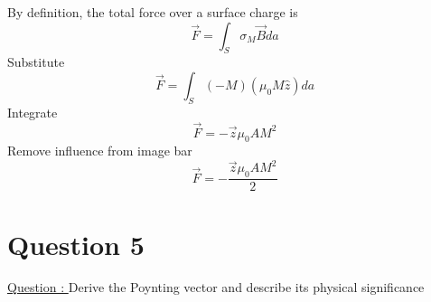 \documentclass[12pt]{article}
\begin{document}
    By definition, the total force over a surface charge is
    \begin{equation} \label{eq: 4-7}
        \vec{F} = \int_S \sigma_M \vec{B} da
    \end{equation}
    Substitute 
    \begin{equation} \label{eq: 4-8}
        \vec{F} = \int_S (-M) (\mu_0 M \hat{z}) da
    \end{equation}
    Integrate
    \begin{equation} \label{eq: 4-9}
        \vec{F} = -\vec{z} \mu_0 A M^2
    \end{equation}
    Remove influence from image bar
    \begin{equation} \label{eq: 4-10}
        \vec{F} = -\frac{\vec{z} \mu_0 A M^2}{2} 
    \end{equation}

    
\newpage
\section{Question 5} \label{section5}
    \underline{Question : }
    Derive the Poynting vector and describe its physical significance
    
\end{document}
